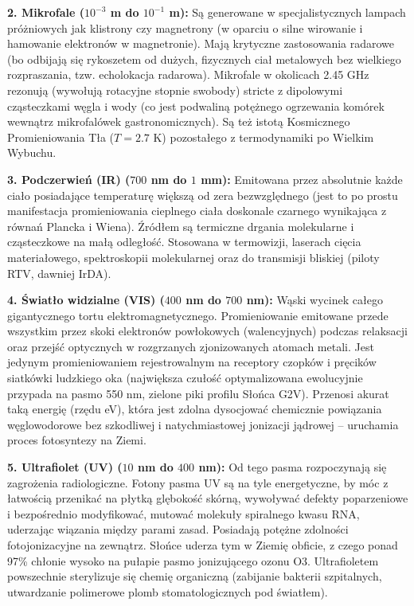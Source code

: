 \documentclass[11pt, a4paper]{article}
\begin{document}
\textbf{2. Mikrofale ($10^{-3}$ m do $10^{-1}$ m):}
Są generowane w specjalistycznych lampach próżniowych jak klistrony czy magnetrony (w oparciu o silne wirowanie i hamowanie elektronów w magnetronie). Mają krytyczne zastosowania radarowe (bo odbijają się rykoszetem od dużych, fizycznych ciał metalowych bez wielkiego rozpraszania, tzw. echolokacja radarowa). Mikrofale w okolicach 2.45 GHz rezonują (wywołują rotacyjne stopnie swobody) stricte z dipolowymi cząsteczkami węgla i wody (co jest podwaliną potężnego ogrzewania komórek wewnątrz mikrofalówek gastronomicznych). Są też istotą Kosmicznego Promieniowania Tła ($T = 2.7$ K) pozostałego z termodynamiki po Wielkim Wybuchu.

\textbf{3. Podczerwień (IR) ($700$ nm do $1$ mm):}
Emitowana przez absolutnie każde ciało posiadające temperaturę większą od zera bezwzględnego (jest to po prostu manifestacja promieniowania cieplnego ciała doskonale czarnego wynikająca z równań Plancka i Wiena). Źródłem są termiczne drgania molekularne i cząsteczkowe na małą odległość. Stosowana w termowizji, laserach cięcia materiałowego, spektroskopii molekularnej oraz do transmisji bliskiej (piloty RTV, dawniej IrDA).

\textbf{4. Światło widzialne (VIS) ($400$ nm do $700$ nm):}
Wąski wycinek całego gigantycznego tortu elektromagnetycznego. Promieniowanie emitowane przede wszystkim przez skoki elektronów powłokowych (walencyjnych) podczas relaksacji oraz przejść optycznych w rozgrzanych zjonizowanych atomach metali. Jest jedynym promieniowaniem rejestrowalnym na receptory czopków i pręcików siatkówki ludzkiego oka (największa czułość optymalizowana ewolucyjnie przypada na pasmo 550 nm, zielone piki profilu Słońca G2V). Przenosi akurat taką energię (rzędu eV), która jest zdolna dysocjować chemicznie powiązania węglowodorowe bez szkodliwej i natychmiastowej jonizacji jądrowej – uruchamia proces fotosyntezy na Ziemi.

\textbf{5. Ultrafiolet (UV) ($10$ nm do $400$ nm):}
Od tego pasma rozpoczynają się zagrożenia radiologiczne. Fotony pasma UV są na tyle energetyczne, by móc z łatwością przenikać na płytką glębokość skórną, wywoływać defekty poparzeniowe i bezpośrednio modyfikować, mutować molekuły spiralnego kwasu RNA, uderzając wiązania między parami zasad. Posiadają potężne zdolności fotojonizacyjne na zewnątrz. Słońce uderza tym w Ziemię obficie, z czego ponad 97\% chłonie wysoko na pułapie pasmo jonizującego ozonu O3. Ultrafioletem powszechnie sterylizuje się chemię organiczną (zabijanie bakterii szpitalnych, utwardzanie polimerowe plomb stomatologicznych pod światłem).
\end{document}
